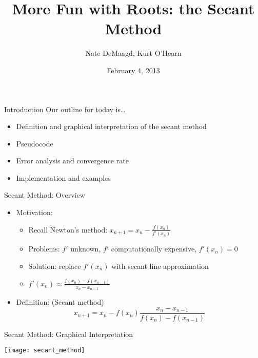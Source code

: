 \documentclass[9pt, serif]{beamer}
\title[Secant method]
{More Fun with Roots: the Secant Method}
\author[]
{Nate DeMaagd, Kurt O'Hearn}
\institute[Grand Valley State University]
{MTH 499-02}
\date{February 4, 2013}
\newcommand{\bi}{\begin{itemize}}
\newcommand{\ei}{\end{itemize}}
\begin{document}
\begin{frame}
  \titlepage
\end{frame}



\begin{frame}{\hspace{50mm}Introduction}
    \LARGE{Our outline for today is\ldots }
    \pause
    \bi
        \item Definition and graphical interpretation of the secant method
        \pause
        \item Pseudocode
        \pause
        \item Error analysis and convergence rate
        \pause
        \item Implementation and examples
    \ei
\end{frame}

\begin{frame}{\hspace{50mm}Secant Method: Overview}
    \bi
        \item Motivation:
        \pause
        \bi
            \item Recall Newton's method: $x_{n+1} = x_n - \frac{f(x_n)}{f'(x_n)}$
            \pause
            \item Problems: $f'$ unknown, $f'$ computationally expensive, $f'(x_n) = 0$
            \pause
            \item Solution: replace $f'(x_n)$ with secant line approximation
            \pause
            \item $f'(x_n) \approx \frac{f(x_n) - f(x_{n-1})}{x_n - x_{n-1}}$
        \ei
        \pause
        \item Definition: (Secant method) \\
        \pause
        $$x_{n+1} = x_n - f(x_n)\frac{x_n - x_{n-1}}{f(x_n) - f(x_{n-1})}$$
    \ei
\end{frame}

\begin{frame}{\hspace{50mm}Secant Method: Graphical Interpretation}
    \begin{center}
        \texttt{[image: secant\_method]}
    \end{center}
\end{frame}
\end{document}
